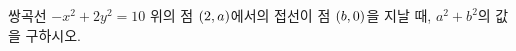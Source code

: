 쌍곡선 $-x^2+2y^2=10$ 위의 점 $(2{,}\mkern3mu\mathopen{}a)$에서의 접선이 점 $(b{,}\mkern3mu\mathopen{}0)$을 지날 때, $a^2+b^2$의 값을 구하시오.
